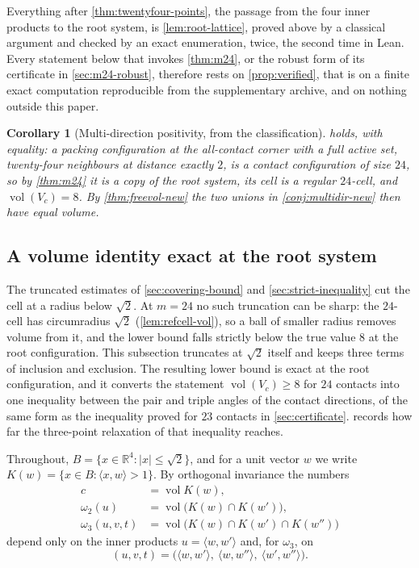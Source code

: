 \documentclass[11pt,reqno]{amsart}
\renewcommand{\_}{\origunderscore\allowbreak}
\numberwithin{equation}{section}
\theoremstyle{plain}
\newtheorem{cor}[thm]{Corollary}
\theoremstyle{definition}
\theoremstyle{remark}
\DeclareMathOperator{\vol}{vol}
\begin{document}
Everything after \cref{thm:twentyfour-points}, the passage from the four
inner products to the root system, is \cref{lem:root-lattice}, proved
above by a classical argument and checked by an exact enumeration, twice,
the second time in Lean. Every
statement below that invokes \cref{thm:m24}, or the robust form of its
certificate in \cref{sec:m24-robust}, therefore rests on
\cref{prop:verified}, that is on a finite exact computation reproducible
from the supplementary archive, and on nothing outside this paper.

\begin{cor}[Multi-direction positivity, from the classification]\label{cor:conj-resolved}
 holds, with equality: a packing configuration at
the all-contact corner with a full active set, twenty-four neighbours at
distance exactly $2$, is a contact configuration of size $24$, so by
\cref{thm:m24} it is a copy of the root system, its cell is a regular
$24$-cell, and $\vol(V_c)=8$. By \cref{thm:freevol-new} the two unions in
\cref{conj:multidir-new} then have equal volume.
\end{cor}

\subsection{A volume identity exact at the root system}\label{sec:m24-volume}

The truncated estimates of \cref{sec:covering-bound} and
\cref{sec:strict-inequality} cut the cell at a radius below $\sqrt2$.
At $m=24$ no such truncation can be sharp: the $24$-cell has
circumradius $\sqrt2$ (\cref{lem:refcell-vol}), so a ball of smaller
radius removes volume from it, and the lower bound falls strictly below
the true value $8$ at the root configuration. This subsection truncates
at $\sqrt2$ itself and keeps three terms of inclusion and exclusion. The
resulting lower bound is exact at the root configuration, and it
converts the statement $\vol(V_c)\ge8$ for $24$ contacts into one
inequality between the pair and triple angles of the contact
directions, of the same form as the inequality proved for $23$ contacts
in \cref{sec:certificate}.  records how far the
three-point relaxation of that inequality reaches.

Throughout, $B=\{x\in\mathbb{R}^4:|x|\le\sqrt2\}$, and for a unit vector
$w$ we write $K(w)=\{x\in B:\langle x,w\rangle>1\}$. By orthogonal
invariance the numbers
\begin{align*}
  c&=\vol K(w),\\
  \omega_2(u)&=\vol\bigl(K(w)\cap K(w')\bigr),\\
  \omega_3(u,v,t)&=\vol\bigl(K(w)\cap K(w')\cap K(w'')\bigr)
\end{align*}
depend only on the inner products $u=\langle w,w'\rangle$ and, for
$\omega_3$, on
\[
  (u,v,t)=\bigl(\langle w,w'\rangle,\ \langle w,w''\rangle,\
  \langle w',w''\rangle\bigr).
\]
\end{document}
